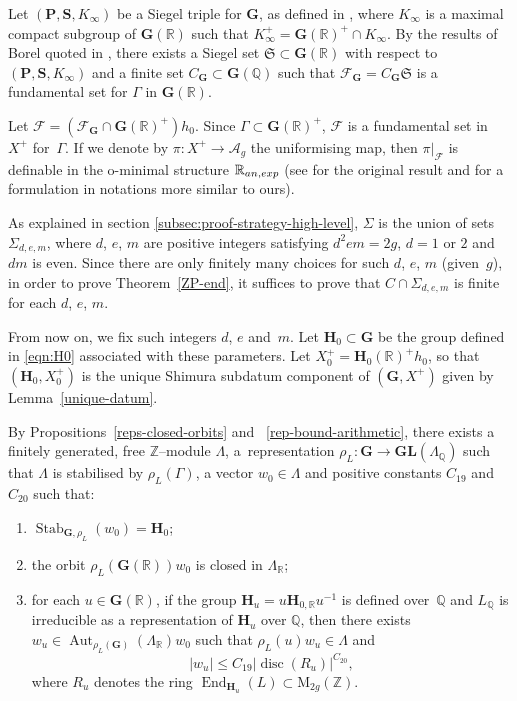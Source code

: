 \documentclass[11pt]{article}
\numberwithin{equation}{section}
\newenvironment{enumeratei}
{\bgroup\def\theenumi{\roman{enumi}}\def\theenumii{\alph{enumii}}\begin{enumerate}}
{\end{enumerate}\egroup}
\newcommand{\bQ}{\mathbb{Q}}
\newcommand{\bR}{\mathbb{R}}
\newcommand{\bZ}{\mathbb{Z}}
\newcommand{\cA}{\mathcal{A}}
\newcommand{\cF}{\mathcal{F}}
\newcommand{\fS}{\mathfrak{S}}
\newcommand{\gG}{\mathbf{G}}
\newcommand{\gGL}{\mathbf{GL}}
\newcommand{\gH}{\mathbf{H}}
\newcommand{\gP}{\mathbf{P}}
\newcommand{\gS}{\mathbf{S}}
\newcommand{\rM}{\mathrm{M}}
\DeclareMathOperator{\Aut}{Aut}
\DeclareMathOperator{\disc}{disc}
\DeclareMathOperator{\End}{End}
\DeclareMathOperator{\Stab}{Stab}
\newcommand{\abs}[1]{\lvert #1 \rvert}
\begin{document}
Let $(\gP, \gS, K_\infty)$ be a Siegel triple for $\gG$, as defined in \cite[\S2B]{Orr18}, where $K_\infty$ is a maximal compact subgroup of $\gG(\bR)$ such that $K^+_\infty=\gG(\bR)^+\cap K_\infty$.
By the results of Borel quoted in \cite[\S2D]{Orr18}, there exists a Siegel set $\fS \subset \gG(\bR)$ with respect to $(\gP, \gS, K_\infty)$ and a finite set $C_\gG\subset\gG(\bQ)$ such that $\cF_{\gG}=C_\gG\fS$ is a fundamental set for $\Gamma$ in $\gG(\bR)$.

Let $\cF = (\cF_\gG \cap \gG(\bR)^+) h_0$. Since $\Gamma \subset \gG(\bR)^+$, $\cF$ is a fundamental set in $X^+$ for~$\Gamma$. If we denote by $\pi:X^+\to\cA_g$ the uniformising map, then $\pi|_{\cF}$ is definable in the o-minimal structure $\bR_{\rm an,exp}$ (see \cite{PS10} for the original result and \cite{kuy:ax-lindemann} for a formulation in notations more similar to ours).

As explained in section \ref{subsec:proof-strategy-high-level}, $\Sigma$ is the union of sets $\Sigma_{d,e,m}$, where $d$, $e$, $m$ are positive integers satisfying $d^2em=2g$, $d=1$ or $2$ and $dm$ is even.
Since there are only finitely many choices for such $d$, $e$, $m$ (given~$g$), in order to prove Theorem~\ref{ZP-end}, it suffices to prove that $C \cap \Sigma_{d,e,m}$ is finite for each $d$, $e$, $m$.

From now on, we fix such integers $d$, $e$ and~$m$. Let $\gH_0 \subset \gG$ be the group defined in \eqref{eqn:H0} associated with these parameters.
Let $X_0^+ = \gH_0(\bR)^+h_0$, so that $(\gH_0, X_0^+)$ is the unique Shimura subdatum component of $(\gG, X^+)$ given by Lemma~\ref{unique-datum}.

By Propositions~\ref{reps-closed-orbits} and~ \ref{rep-bound-arithmetic}, there exists a finitely generated, free $\bZ$--module $\Lambda$, a~re\-pre\-sentation $\rho_L:\gG\to\gGL(\Lambda_\bQ)$ such that $\Lambda$ is stabilised by $\rho_L(\Gamma)$, a vector $w_0\in\Lambda$ and positive constants $C_{19}$ and $C_{20}$ such that:
\begin{enumeratei}
\item $\Stab_{\gG,\rho_L}(w_0) = \gH_0$;

\item the orbit $\rho_L(\gG(\bR))w_0$ is closed in $\Lambda_\bR$;

\item for each $u \in \gG(\bR)$, if the group $\gH_u = u \gH_{0,\bR} u^{-1}$ is defined over~$\bQ$ and $L_\bQ$ is irreducible as a representation of $\gH_u$ over $\bQ$, then there exists $w_u \in \Aut_{\rho_L(\gG)}(\Lambda_\bR) w_0$ such that $\rho_L(u) w_u \in \Lambda$ and
\[
\abs{w_u} \leq C_{19} \abs{\disc(R_u)}^{C_{20}},
\]
where $R_u$ denotes the ring $\End_{\gH_u}(L) \subset \rM_{2g}(\bZ)$.
\end{enumeratei}
\end{document}
